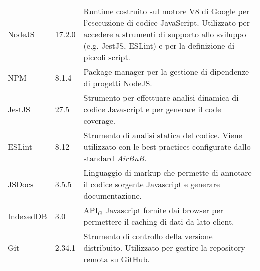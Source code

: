 {\begin{longtable}{|C{2.5cm}|C{2cm}|L{9cm}|}
   \\ \hline
  NodeJS       & 17.2.0    & Runtime costruito sul motore V8 di Google per l'esecuzione di codice JavaScript. Utilizzato per accedere a strumenti di supporto allo sviluppo (e.g. JestJS, ESLint) e per la definizione di piccoli script. \\  \hline
  NPM       & 8.1.4    & Package manager per la gestione di dipendenze di progetti NodeJS. \\  \hline
  JestJS       & 27.5    & Strumento per effettuare analisi dinamica di codice Javascript e per generare il code coverage. \\  \hline
  ESLint       & 8.12    & Strumento di analisi statica del codice. Viene utilizzato con le best practices configurate dallo standard \textit{AirBnB}. \\  \hline
  JSDocs       & 3.5.5    & Linguaggio di markup che permette di annotare il codice sorgente Javascript e generare documentazione. \\  \hline
  IndexedDB       & 3.0    & API$_G$ Javascript fornite dai browser per permettere il caching di dati da lato client. \\  \hline
  Git       & 2.34.1    & Strumento di controllo della versione distribuito. Utilizzato per gestire la repository remota su GitHub. \\  \hline

\end{longtable}}

\renewcommand\arraystretch{1}
